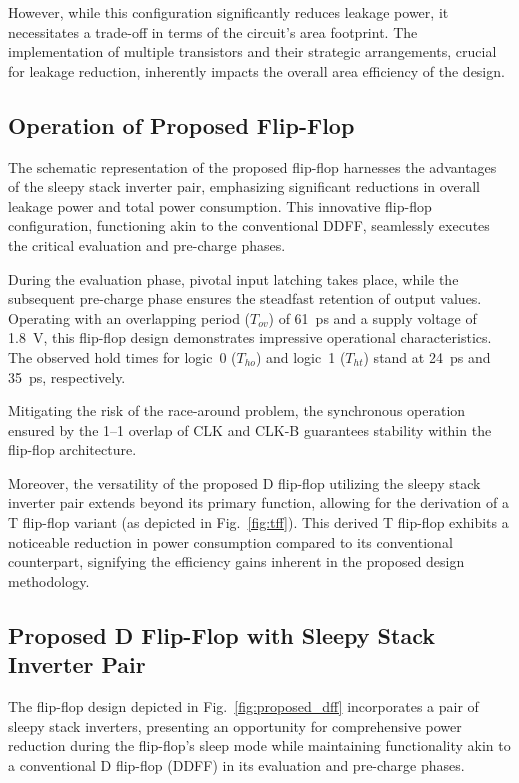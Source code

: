 \documentclass[conference]{IEEEtran}
\begin{document}
However, while this configuration significantly reduces leakage power, it necessitates a trade-off in terms of the circuit's area footprint. The implementation of multiple transistors and their strategic arrangements, crucial for leakage reduction, inherently impacts the overall area efficiency of the design.

\subsection{Operation of Proposed Flip-Flop}

The schematic representation of the proposed flip-flop harnesses the advantages of the sleepy stack inverter pair, emphasizing significant reductions in overall leakage power and total power consumption. This innovative flip-flop configuration, functioning akin to the conventional DDFF, seamlessly executes the critical evaluation and pre-charge phases.

During the evaluation phase, pivotal input latching takes place, while the subsequent pre-charge phase ensures the steadfast retention of output values. Operating with an overlapping period ($T_{ov}$) of 61~ps and a supply voltage of 1.8~V, this flip-flop design demonstrates impressive operational characteristics. The observed hold times for logic~0 ($T_{ho}$) and logic~1 ($T_{ht}$) stand at 24~ps and 35~ps, respectively.

Mitigating the risk of the race-around problem, the synchronous operation ensured by the 1--1 overlap of CLK and CLK-B guarantees stability within the flip-flop architecture.

Moreover, the versatility of the proposed D flip-flop utilizing the sleepy stack inverter pair extends beyond its primary function, allowing for the derivation of a T flip-flop variant (as depicted in Fig.~\ref{fig:tff}). This derived T flip-flop exhibits a noticeable reduction in power consumption compared to its conventional counterpart, signifying the efficiency gains inherent in the proposed design methodology.

\subsection{Proposed D Flip-Flop with Sleepy Stack Inverter Pair}

The flip-flop design depicted in Fig.~\ref{fig:proposed_dff} incorporates a pair of sleepy stack inverters, presenting an opportunity for comprehensive power reduction during the flip-flop's sleep mode while maintaining functionality akin to a conventional D flip-flop (DDFF) in its evaluation and pre-charge phases.
\end{document}

